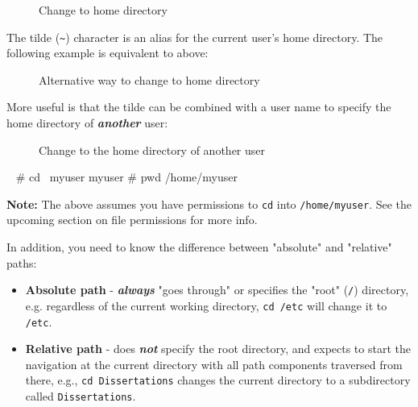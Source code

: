 \documentclass[10pt,american,]{book}
\newenvironment{Shaded}{\begin{snugshade}}{\end{snugshade}}
\newcommand{\KeywordTok}[1]{\textcolor[rgb]{0.13,0.29,0.53}{\textbf{{#1}}}}
\newcommand{\CommentTok}[1]{\textcolor[rgb]{0.56,0.35,0.01}{\textit{{#1}}}}
\newcommand{\NormalTok}[1]{{#1}}
\numberwithin{figure}{chapter}
\DeclareRobustCommand{\drcap}[1]{\begin{figure}[H]\caption{#1}\end{figure}}
\renewcommand{\KeywordTok}[1]{{#1}}
\renewcommand{\CommentTok}[1]{{#1}}
\renewcommand{\NormalTok}[1]{{#1}}
\begin{document}
\drcap{Change to home directory}

\begin{Shaded}
\end{Shaded}

The tilde
(\texttt{\textasciitilde{}})
 character is an alias
for the current user's home directory. The following example is
equivalent to above:

\drcap{Alternative way to change to home directory}

\begin{Shaded}
\end{Shaded}

More useful is that the tilde can be combined with a user name to
specify the home directory of \textbf{\emph{another}} user:

\drcap{Change to the home directory of another user}

\begin{Shaded}
\begin{Highlighting}[]
\KeywordTok{~} \CommentTok{# cd ~myuser}
\KeywordTok{myuser} \CommentTok{# pwd}
\KeywordTok{/home/myuser}
\end{Highlighting}
\end{Shaded}

\textbf{Note:} The above assumes you have permissions to \texttt{cd}
into \texttt{/home/myuser}. See the upcoming section on file permissions
for more info.

In addition, you need to know the difference between "absolute" and
"relative" paths:

\begin{itemize}
\item
  \textbf{Absolute path} -
  \textbf{\emph{always}} "goes through" or specifies the "root"
  (\texttt{/})
  directory, e.g. regardless of the current working directory,
  \texttt{cd\ /etc} will change it to \texttt{/etc}.
\item
  \textbf{Relative path} -
  does \textbf{\emph{not}} specify the root directory, and expects to
  start the navigation at the current directory with all path components
  traversed from there, e.g., \texttt{cd\ Dissertations} changes the
  current directory to a subdirectory called \texttt{Dissertations}.
\end{itemize}
\end{document}
